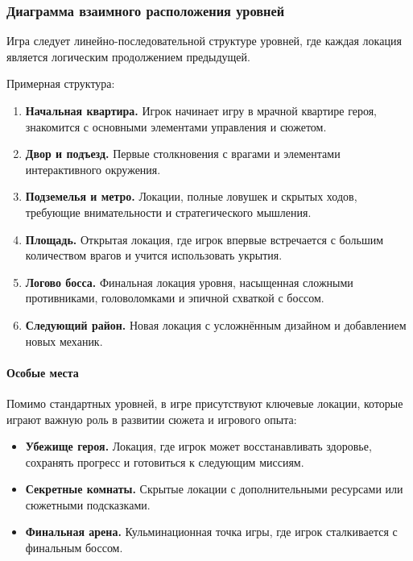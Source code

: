 \documentclass[12pt]{article}
\begin{document}
        \subsubsection{Диаграмма взаимного расположения уровней}
        Игра следует линейно-последовательной структуре уровней, где каждая локация является логическим продолжением предыдущей.  
        
        Примерная структура:  
        \begin{enumerate}
            \item \textbf{Начальная квартира.} Игрок начинает игру в мрачной квартире героя, знакомится с основными элементами управления и сюжетом.  
            \item \textbf{Двор и подъезд.} Первые столкновения с врагами и элементами интерактивного окружения.  
            \item \textbf{Подземелья и метро.} Локации, полные ловушек и скрытых ходов, требующие внимательности и стратегического мышления.  
            \item \textbf{Площадь.} Открытая локация, где игрок впервые встречается с большим количеством врагов и учится использовать укрытия.  
            \item \textbf{Логово босса.} Финальная локация уровня, насыщенная сложными противниками, головоломками и эпичной схваткой с боссом.  
            \item \textbf{Следующий район.} Новая локация с усложнённым дизайном и добавлением новых механик.  
        \end{enumerate}
        
        \paragraph{Особые места}  
        Помимо стандартных уровней, в игре присутствуют ключевые локации, которые играют важную роль в развитии сюжета и игрового опыта:  
        \begin{itemize}
            \item \textbf{Убежище героя.} Локация, где игрок может восстанавливать здоровье, сохранять прогресс и готовиться к следующим миссиям.  
            \item \textbf{Секретные комнаты.} Скрытые локации с дополнительными ресурсами или сюжетными подсказками.  
            \item \textbf{Финальная арена.} Кульминационная точка игры, где игрок сталкивается с финальным боссом.  
        \end{itemize}
        
\end{document}
